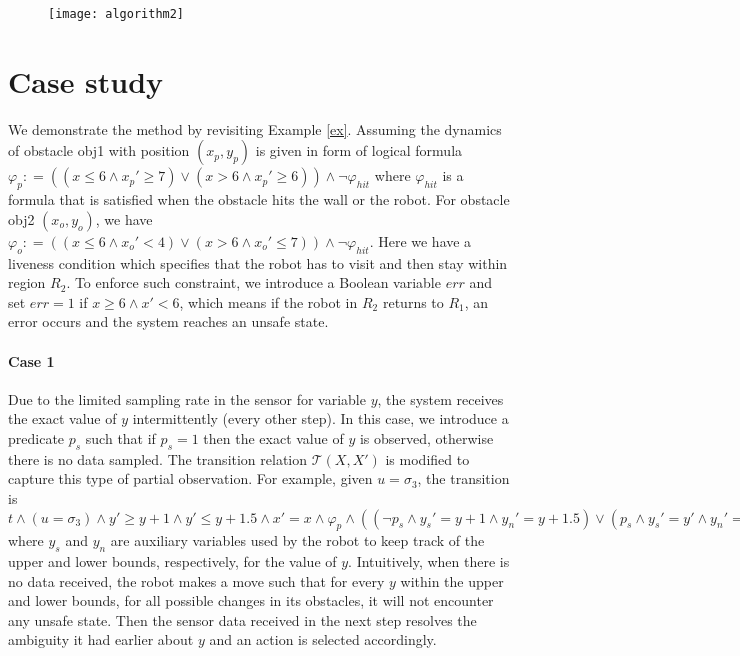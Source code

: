 \documentclass[letterpaper, 10 pt, conference]{ieeeconf}
\begin{document}
\vspace{-2ex}
\begin{figure}[ht]
\centering
\texttt{[image: algorithm2]}
\label{alg:sensor_reconfig}
\end{figure}
\vspace{-4ex}

\section{Case study}
\label{subsec:case}
We demonstrate the method by revisiting Example \ref{ex}. Assuming the
dynamics of obstacle obj1 with position $(x_p,y_p)$ is given in form
of logical formula $\varphi_{p}: = ((x \le 6 \land x_p' \ge 7) \lor (x
> 6 \land x_p' \ge 6)) \land \neg \varphi_{hit}$ where $\varphi_{hit}$
is a formula that is satisfied when the obstacle hits the wall or the
robot.  For obstacle obj2 $(x_o,y_o)$, we have $\varphi_{o}: = ((x \le
6 \land x_o '< 4) \lor( x > 6 \land x_o'\le 7)) \land \neg
\varphi_{hit}$. Here we have a liveness condition which specifies that
the robot has to visit and then stay within region $R_2$. To enforce
such constraint, we introduce a Boolean variable $err$ and set $err
=1$ if $x \ge 6\land x' < 6 $, which means if the robot in $R_2$
returns to $R_1$, an error occurs and the system reaches an unsafe
state.
\paragraph*{Case 1}
Due to the limited sampling rate in the sensor for variable $y$, the
system receives the exact value of $y$ intermittently (every other
step). In this case, we introduce a predicate $p_s$ such that if  $p_s =1$
then the exact value of $y$ is observed, otherwise there is no data
sampled. The transition relation $\mathcal{T}(X,X')$ is modified to
capture this type of partial observation. For example, given $u
=\sigma_3$, the transition is $ t \land( u=\sigma_3 )\land y' \ge y+1
\land y'\le y+1.5 \land x'=x \land \varphi_p \land ((\neg p_s \land
y_s' = y +1 \land y_n' = y+1.5 ) \lor ( p_s \land y_s' =y' \land y_n'
= y')) \land p_s' =\neg p_s \land t'= \neg t $ where $y_s$ and $y_n$
are auxiliary variables used by the robot to keep track of the upper
and lower bounds, respectively, for the value of $y$. Intuitively,
when there is no data received, the robot makes a move such that for
every $y$ within the upper and lower bounds, for all possible changes
in its obstacles, it will not encounter any unsafe state.  Then the
sensor data received in the next step resolves the ambiguity it
had earlier about $y$ and an action is selected accordingly.
\end{document}
